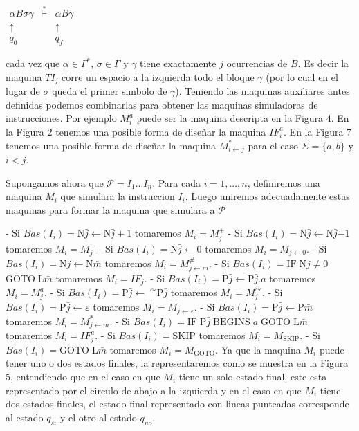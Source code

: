 \(\displaystyle \begin{array}{ccc} \alpha B\sigma \gamma & \overset{\ast }{\vdash } & \alpha B\gamma \\ \uparrow \ & & \uparrow \\ q_{0}\ \ & & q_{f} \end{array} \)

cada vez que \(\alpha \in \Gamma ^{\ast }\), \(\sigma \in \Gamma \) y \(\gamma \) tiene exactamente \(j\) ocurrencias de \(B\). Es decir la maquina \(TI_{j}\) corre un espacio a la izquierda todo el bloque \(\gamma \) (por lo cual en el lugar de \(\sigma \) queda el primer simbolo de \(\gamma \)).
Teniendo las maquinas auxiliares antes definidas podemos combinarlas para obtener las maquinas simuladoras de instrucciones. Por ejemplo \(M_{i}^{a}\) puede ser la maquina descripta en la Figura 4. En la Figura 2 tenemos una posible forma de dise\~{n}ar la maquina \(IF_{i}^{a}\). En la Figura 7 tenemos una posible forma de dise\~{n}ar la maquina \(M_{i\leftarrow j}^{\ast }\) para el caso \(\Sigma =\{a,b\}\) y \(i< j\).

Supongamos ahora que \(\mathcal{P}=I_{1}...I_{n}\). Para cada \(i=1,...,n\), definiremos una maquina \(M_{i}\) que simulara la instruccion \(I_{i}\). Luego uniremos adecuadamente estas maquinas para formar la maquina que simulara a \( \mathcal{P}\)

- Si \(Bas(I_{i})=\mathrm{N}\bar{j}\leftarrow \mathrm{N}\bar{j}+1\) tomaremos \(M_{i}=M_{j}^{+}\)
- Si \(Bas(I_{i})=\mathrm{N}\bar{j}\leftarrow \mathrm{N}\bar{j}\dot{-} 1 \) tomaremos \(M_{i}=M_{j}^{\dot{-}}\)
- Si \(Bas(I_{i})=\mathrm{N}\bar{j}\leftarrow 0\) tomaremos \( M_{i}=M_{j\leftarrow 0}\).
- Si \(Bas(I_{i})=\mathrm{N}\bar{j}\leftarrow \mathrm{N}\bar{m}\) tomaremos \(M_{i}=M_{j\leftarrow m}^{\#}\).
- Si \(Bas(I_{i})=\mathrm{IF}\;\mathrm{N}\bar{j}\not=0\) \(\mathrm{GOTO} \;\mathrm{L}\bar{m}\) tomaremos \(M_{i}=IF_{j}.\)
- Si \(Bas(I_{i})=\mathrm{P}\bar{j}\leftarrow \mathrm{P}\bar{j}.a\) tomaremos \(M_{i}=M_{j}^{a}\).
- Si \(Bas(I_{i})=\mathrm{P}\bar{j}\leftarrow \ ^{\curvearrowright } \mathrm{P}\bar{j}\) tomaremos \(M_{i}=M_{j}^{\curvearrowright }\).
- Si \(Bas(I_{i})=\mathrm{P}\bar{j}\leftarrow \varepsilon \) tomaremos \( M_{i}=M_{j\leftarrow \varepsilon }\).
- Si \(Bas(I_{i})=\mathrm{P}\bar{j}\leftarrow \mathrm{P}\bar{m}\) tomaremos \(M_{i}=M_{j\leftarrow m}^{\ast }\).
- Si \(Bas(I_{i})=\mathrm{IF}\;\mathrm{P}\bar{j}\;\mathrm{BEGINS}\;a\; \mathrm{GOTO}\;\mathrm{L}\bar{m}\) tomaremos \(M_{i}=IF_{j}^{a}\).
- Si \(Bas(I_{i})=\mathrm{SKIP}\) tomaremos \(M_{i}=M_{\mathrm{SKIP}}\).
- Si \(Bas(I_{i})=\mathrm{GOTO}\;\mathrm{L}\bar{m}\) tomaremos \( M_{i}=M_{\mathrm{GOTO}}\).
Ya que la maquina \(M_{i}\) puede tener uno o dos estados finales, la representaremos como se muestra en la Figura 5, entendiendo que en el caso en que \(M_{i}\) tiene un solo estado final, este esta representado por el circulo de abajo a la izquierda y en el caso en que \(M_{i}\) tiene dos estados finales, el estado final representado con lineas punteadas corresponde al estado \(q_{si}\) y el otro al estado \(q_{no}\).

